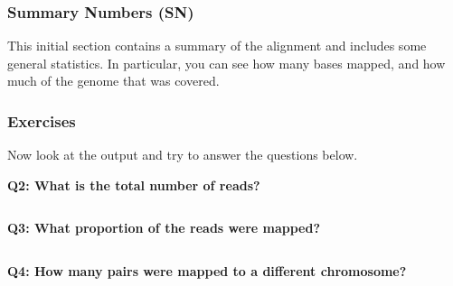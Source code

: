 \documentclass[11pt]{article}
\makeatletter
\newcommand{\boxspacing}{\kern\kvtcb@left@rule\kern\kvtcb@boxsep}
\newcommand{\prompt}[4]{
        \ttfamily\llap{{\color{#2}\LARGE\faKeyboardO\hspace{3pt}#4}}\vspace{-\baselineskip}
    }
\makeatother
\begin{document}
    \hypertarget{summary-numbers-sn}{%
\subsubsection{Summary Numbers (SN)}\label{summary-numbers-sn}}

This initial section contains a summary of the alignment and includes
some general statistics. In particular, you can see how many bases
mapped, and how much of the genome that was covered.

\hypertarget{exercises}{%
\subsubsection{Exercises}\label{exercises}}

    Now look at the output and try to answer the questions below.

\textbf{Q2: What is the total number of reads?}

    \begin{tcolorbox}[breakable, size=fbox, boxrule=1pt, pad at break*=1mm,colback=cellbackground, colframe=cellborder]
\prompt{In}{incolor}{ }{\boxspacing}
\begin{Verbatim}[commandchars=\\\{\}]

\end{Verbatim}
\end{tcolorbox}

    \textbf{Q3: What proportion of the reads were mapped?}

    \begin{tcolorbox}[breakable, size=fbox, boxrule=1pt, pad at break*=1mm,colback=cellbackground, colframe=cellborder]
\prompt{In}{incolor}{ }{\boxspacing}
\begin{Verbatim}[commandchars=\\\{\}]

\end{Verbatim}
\end{tcolorbox}

    \textbf{Q4: How many pairs were mapped to a different chromosome?}

    \begin{tcolorbox}[breakable, size=fbox, boxrule=1pt, pad at break*=1mm,colback=cellbackground, colframe=cellborder]
\prompt{In}{incolor}{ }{\boxspacing}
\begin{Verbatim}[commandchars=\\\{\}]

\end{Verbatim}
\end{tcolorbox}
\end{document}
